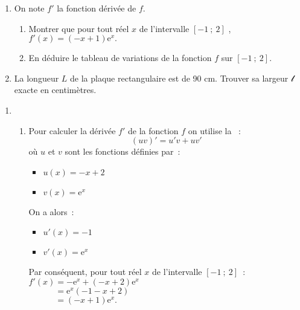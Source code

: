 \begin{enumerate}
     \item
     On note $f' $ la fonction dérivée de  $f$.
     \begin{enumerate}[label=\alph*.]
          \item
          Montrer que pour tout réel $x$ de l'intervalle $[  - 1~;~2 ]$ , $f' ( x )=(  - x+1 )\text{e}^{ x }. $
          \item
          En déduire le tableau de variations de la fonction $f$ sur $[  - 1~;~2 ].$
     \end{enumerate}
     \item
     La longueur $L$ de la plaque rectangulaire est de 90 cm. Trouver sa largeur $ \mathscr{l}$ exacte en centimètres.
\end{enumerate}
\begin{corrige}
     \begin{enumerate}
          \item
          \begin{enumerate}[label=\alph*.]
               \item
               Pour calculer la dérivée $f'$ de la fonction $f$ on utilise la ~:
               \[
               ( uv )' =u' v+uv'
               \]
               où  $u$ et $v$ sont les fonctions définies par~:\\
               \begin{itemize}
                    \item
                    $u( x )= - x+2$
                    \item
                    $v( x )=\text{e}^{ x }$
               \end{itemize}
               On a alors~:
               \begin{itemize}
                    \item
                    $u' ( x )= - 1$
                    \item
                    $v' ( x )=\text{e}^{ x }$
               \end{itemize}
               Par conséquent, pour tout réel $x$ de l'intervalle  $\left[  - 1~;~2\right]$~:
               \newpar
               $f' ( x )= - \text{e}^{ x }+(  - x+2 )\text{e}^{ x }$\\
               $\phantom{f' ( x )}=\text{e}^{ x }\left(  - 1 - x+2 \right)$\\
               $\phantom{f' ( x )}=\left(  - x+1 \right)\text{e}^{ x }.$

\end{enumerate}
\end{enumerate}
\end{corrige}
